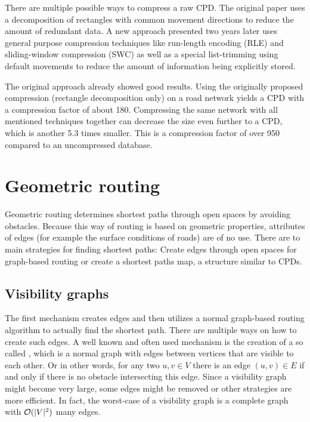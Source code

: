 			There are multiple possible ways to compress a raw CPD.
			The original paper uses a decomposition of rectangles with common movement directions to reduce the amount of redundant data.
			A new approach presented two years later uses general purpose compression techniques like run-length encoding (RLE) and sliding-window compression (SWC) as well as a special list-trimming using default movements to reduce the amount of information being explicitly stored.
			
			The original approach already showed good results.
			Using the originally proposed compression (rectangle decomposition only) on a road network yields a CPD with a compression factor of about 180.
			Compressing the same network with all mentioned techniques together can decrease the size even further to a CPD, which is another 5.3 times smaller.
			This is a compression factor of over 950 compared to an uncompressed database.
	
\section{Geometric routing}
\label{sec:geometric-routing}

	Geometric routing determines shortest paths through open spaces by avoiding obstacles.
	Because this way of routing is based on geometric properties, attributes of edges (for example the surface conditions of roads) are of no use.
	There are to main strategies for finding shortest paths:
	Create edges through open spaces for graph-based routing or create a shortest paths map, a structure similar to CPDs.
	
	\subsection{Visibility graphs}
	\label{subsec:visibility-graph}
	
		The first mechanism creates edges and then utilizes a normal graph-based routing algorithm to actually find the shortest path.
		There are multiple ways on how to create such edges.
		A well known and often used mechanism is the creation of a so called , which is a normal graph with edges between vertices that are visible to each other.
		Or in other words, for any two $u, v \in V$ there is an edge $(u, v) \in E$ if and only if there is no obstacle intersecting this edge.
		Since a visibility graph might become very large, some edges might be removed or other strategies are more efficient.
		In fact, the worst-case of a visibility graph is a complete graph with $\mathcal{O}(|V|^2)$ many edges.
		
